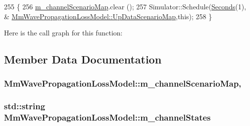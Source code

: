 \begin{DoxyCode}
255 \{
256         \hyperlink{classMmWavePropagationLossModel_a4de546f00ac6bff5b3a0da6fb8283986}{m\_channelScenarioMap}.clear ();
257         Simulator::Schedule(\hyperlink{group__timecivil_ga33c34b816f8ff6628e33d5c8e9713b9e}{Seconds}(1), &
      \hyperlink{classMmWavePropagationLossModel_a36267981dfdc2c694dfad2952ca23f6a}{MmWavePropagationLossModel::UpDataScenarioMap},\textcolor{keyword}{this});
258 \}
\end{DoxyCode}


Here is the call graph for this function\+:




\subsection{Member Data Documentation}
\subsubsection[{\texorpdfstring{m\+\_\+channel\+Scenario\+Map}{m_channelScenarioMap}}]{ Mm\+Wave\+Propagation\+Loss\+Model\+::m\+\_\+channel\+Scenario\+Map\hspace{0.3cm}{\ttfamily [mutable]}, {\ttfamily [private]}}\hypertarget{classMmWavePropagationLossModel_a4de546f00ac6bff5b3a0da6fb8283986}{}\label{classMmWavePropagationLossModel_a4de546f00ac6bff5b3a0da6fb8283986}
\subsubsection[{\texorpdfstring{m\+\_\+channel\+States}{m_channelStates}}]{\setlength{\rightskip}{0pt plus 5cm}std\+::string Mm\+Wave\+Propagation\+Loss\+Model\+::m\+\_\+channel\+States\hspace{0.3cm}{\ttfamily [private]}}\hypertarget{classMmWavePropagationLossModel_a81e39f0546fa8b255b69fecc8cea09a0}{}\label{classMmWavePropagationLossModel_a81e39f0546fa8b255b69fecc8cea09a0}

